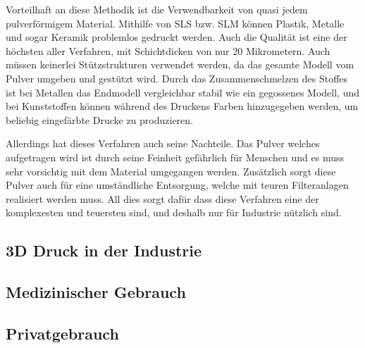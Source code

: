 Vorteilhaft an diese Methodik ist die Verwendbarkeit von quasi jedem pulverförmigem Material. Mithilfe von SLS bzw. SLM können Plastik, Metalle und sogar Keramik problemlos gedruckt werden. Auch die Qualität ist eine der höchsten aller Verfahren, mit Schichtdicken von nur 20 Mikrometern. Auch müssen keinerlei Stützstrukturen verwendet werden, da das gesamte Modell vom Pulver umgeben und gestützt wird. Durch das Zusammenschmelzen des Stoffes ist bei Metallen das Endmodell vergleichbar stabil wie ein gegossenes Modell, und bei Kunststoffen können während des Druckens Farben hinzugegeben werden, um beliebig eingefärbte Drucke zu produzieren.

Allerdings hat dieses Verfahren auch seine Nachteile. Das Pulver welches aufgetragen wird ist durch seine Feinheit gefährlich für Menschen und es muss sehr vorsichtig mit dem Material umgegangen werden. Zusätzlich sorgt diese Pulver auch für eine umständliche Entsorgung, welche mit teuren Filteranlagen realisiert werden muss. All dies sorgt dafür dass diese Verfahren eine der komplexesten und teuersten sind, und deshalb nur für Industrie nützlich sind. \parencite[Informationen aus:][]{DRUCKVERFAHREN,SLSDetail}

\subsection{3D Druck in der Industrie}
\subsection{Medizinischer Gebrauch}
\subsection{Privatgebrauch}